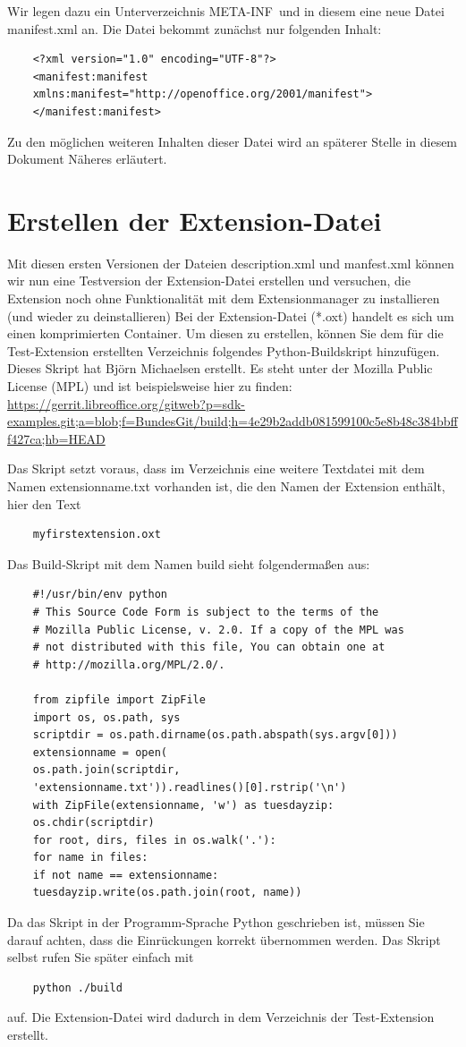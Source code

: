 \documentclass[12pt,a4paper,titlepage]{book}
\begin{document}
Wir legen dazu ein Unterverzeichnis \glqq META-INF\grqq~und in diesem eine neue Datei manifest.xml an. Die Datei bekommt zunächst nur folgenden Inhalt:
\begin{lstlisting}
	<?xml version="1.0" encoding="UTF-8"?>
	<manifest:manifest 
	xmlns:manifest="http://openoffice.org/2001/manifest">
	</manifest:manifest>
\end{lstlisting}

Zu den möglichen weiteren Inhalten dieser Datei wird an späterer Stelle  in diesem Dokument Näheres erläutert.



\section{Erstellen der Extension-Datei}\label{extensiondateierstellen}

Mit diesen ersten Versionen der Dateien description.xml und manfest.xml können wir nun eine Testversion der Extension-Datei erstellen und versuchen, die Extension noch ohne Funktionalität mit dem Extensionmanager zu installieren (und wieder zu deinstallieren)
Bei der Extension-Datei (*.oxt) handelt es sich um einen komprimierten Container. Um diesen zu erstellen, können Sie dem für die Test-Extension erstellten Verzeichnis folgendes Python-Buildskript hinzufügen. Dieses Skript hat Björn Michaelsen erstellt. Es steht unter der Mozilla Public License (MPL) und ist beispielsweise hier zu finden: \linebreak \url{https://gerrit.libreoffice.org/gitweb?p=sdk-examples.git;a=blob;f=BundesGit/build;h=4e29b2addb081599100c5e8b48c384bbfff427ca;hb=HEAD}

Das Skript setzt voraus, dass im Verzeichnis eine weitere Textdatei mit dem Namen extensionname.txt vorhanden ist, die den Namen der Extension enthält, hier den Text
\begin{lstlisting}
	myfirstextension.oxt
\end{lstlisting}
Das Build-Skript mit dem Namen build sieht folgendermaßen aus:
\begin{lstlisting}
	#!/usr/bin/env python
	# This Source Code Form is subject to the terms of the 
	# Mozilla Public License, v. 2.0. If a copy of the MPL was  
	# not distributed with this file, You can obtain one at 
	# http://mozilla.org/MPL/2.0/.
	
	from zipfile import ZipFile
	import os, os.path, sys
	scriptdir = os.path.dirname(os.path.abspath(sys.argv[0]))
	extensionname = open(
	os.path.join(scriptdir, 
	'extensionname.txt')).readlines()[0].rstrip('\n')
	with ZipFile(extensionname, 'w') as tuesdayzip:
	os.chdir(scriptdir)
	for root, dirs, files in os.walk('.'):
	for name in files:
	if not name == extensionname:
	tuesdayzip.write(os.path.join(root, name)) 
\end{lstlisting}
Da das Skript in der Programm-Sprache Python geschrieben ist, müssen Sie darauf achten, dass die Einrückungen korrekt übernommen werden. Das Skript selbst rufen Sie später einfach mit
\begin{lstlisting}
	python ./build
\end{lstlisting}
auf. Die Extension-Datei wird dadurch in dem Verzeichnis der Test-Extension erstellt.
\end{document}
